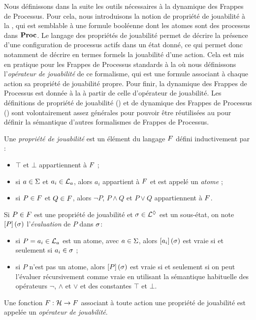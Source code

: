 Nous définissons dans la suite les outils nécessaires à la dynamique des Frappes de Processus.
Pour cela, nous introduisons la notion de propriété de jouabilité à la ,
qui est semblable à une formule booléenne dont les atomes sont des processus dans $\mathbf{Proc}$.
Le langage des propriétés de jouabilité permet de décrire la présence d'une configuration
de processus actifs dans un état donné, ce qui
permet donc notamment de décrire en termes formels la jouabilité d'une action.
Cela est mis en pratique pour les Frappes de Processus standards à la 
où nous définissons l'\emph{opérateur de jouabilité} de ce formalisme,
qui est une formule associant à chaque action sa propriété de jouabilité propre.
Pour finir, la dynamique des Frappes de Processus est donnée à la 
à partir de celle d'opérateur de jouabilité.
Les définitions de propriété de jouabilité () et de dynamique des Frappes de Processus
() sont volontairement assez générales pour pouvoir être réutilisées au
 pour définir la sémantique d'autres formalismes de Frappes de Processus.

\begin{definition}
  Une \emph{propriété de jouabilité} est un élément du langage $F$ défini inductivement par :
  \begin{itemize}
    \item $\top$ et $\bot$ appartiennent à $F$ ;
    \item si $a \in \Sigma$ et $a_i \in \mathcal{L}_a$, alors $a_i$ appartient à $F$
      et est appelé un \emph{atome} ;
    \item si $P \in F$ et $Q \in F$,
      alors $\neg P$, $P \wedge Q$ et $P \vee Q$ appartiennent à $F$.
  \end{itemize}
%
  Si $P \in F$ est une propriété de jouabilité et $\sigma \in \mathcal{L}^\lozenge$ est un sous-état,
  on note $\left[P\right](\sigma)$ l'\emph{évaluation} de $P$ dans $\sigma$:
  \begin{itemize}
    \item si $P = a_i \in \mathcal{L}_a$ est un atome, avec $a \in \Sigma$,
      alors $\left[a_i\right](\sigma)$ est vraie si et seulement si $a_i \in \sigma$ ;
    \item si $P$ n'est pas un atome, alors $\left[P\right](\sigma)$ est vraie si et seulement si
      on peut l'évaluer récursivement comme vraie en utilisant la sémantique habituelle des
      opérateurs $\neg$, $\wedge$ et $\vee$ et des constantes $\top$ et $\bot$.
  \end{itemize}
%
  Une fonction $F : \mathcal{H} \rightarrow F$ associant à toute action une propriété de jouabilité
  est appelée un \emph{opérateur de jouabilité}.
\end{definition}

